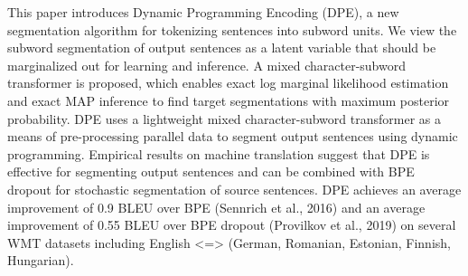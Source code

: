 This paper introduces Dynamic Programming Encoding (DPE), a new segmentation algorithm for tokenizing sentences into subword units. We view the subword segmentation of output sentences as a latent variable that should be marginalized out for learning and inference. A mixed character-subword transformer is proposed, which enables exact log marginal likelihood estimation and exact MAP inference to find target segmentations with maximum posterior probability. DPE uses a lightweight mixed character-subword transformer as a means of pre-processing parallel data to segment output sentences using dynamic programming. Empirical results on machine translation suggest that DPE is effective for segmenting output sentences and can be combined with BPE dropout for stochastic segmentation of source sentences. DPE achieves an average improvement of 0.9 BLEU over BPE (Sennrich et al., 2016) and an average improvement of 0.55 BLEU over BPE dropout (Provilkov et al., 2019) on several WMT datasets including English <=> (German, Romanian, Estonian, Finnish, Hungarian).
